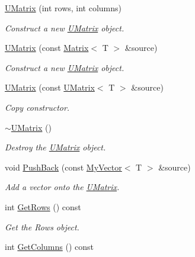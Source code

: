 \begin{DoxyCompactItemize}
\item 
\mbox{\hyperlink{class_u_matrix_ad0d2d3e05ad904daed36504eddd25a2c}{U\+Matrix}} (int rows, int columns)
\begin{DoxyCompactList}\small\item\em Construct a new \mbox{\hyperlink{class_u_matrix}{U\+Matrix}} object. \end{DoxyCompactList}\item 
\mbox{\hyperlink{class_u_matrix_a784cebb7d674ada97720bcb34f49ca6b}{U\+Matrix}} (const \mbox{\hyperlink{class_matrix}{Matrix}}$<$ T $>$ \&source)
\begin{DoxyCompactList}\small\item\em Construct a new \mbox{\hyperlink{class_u_matrix}{U\+Matrix}} object. \end{DoxyCompactList}\item 
\mbox{\hyperlink{class_u_matrix_ab95abe504ff32df243d625b6b749077d}{U\+Matrix}} (const \mbox{\hyperlink{class_u_matrix}{U\+Matrix}}$<$ T $>$ \&source)
\begin{DoxyCompactList}\small\item\em Copy constructor. \end{DoxyCompactList}\item 
\mbox{\hyperlink{class_u_matrix_ada29056d4baec18fcb9bc47dc49e8d53}{$\sim$\+U\+Matrix}} ()
\begin{DoxyCompactList}\small\item\em Destroy the \mbox{\hyperlink{class_u_matrix}{U\+Matrix}} object. \end{DoxyCompactList}\item 
void \mbox{\hyperlink{class_u_matrix_a57003b0a0f3fe394ab04f9588732a928}{Push\+Back}} (const \mbox{\hyperlink{class_my_vector}{My\+Vector}}$<$ T $>$ \&source)
\begin{DoxyCompactList}\small\item\em Add a vector onto the \mbox{\hyperlink{class_u_matrix}{U\+Matrix}}. \end{DoxyCompactList}\item 
int \mbox{\hyperlink{class_u_matrix_ae261286236cb23a0dfa1296591f4c3ad}{Get\+Rows}} () const
\begin{DoxyCompactList}\small\item\em Get the Rows object. \end{DoxyCompactList}\item 
int \mbox{\hyperlink{class_u_matrix_a4065961abb79fd43d7abaf10c47e73d8}{Get\+Columns}} () const

\end{DoxyCompactItemize}
